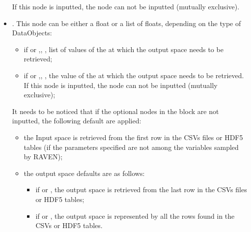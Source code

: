 \begin{itemize}
    If this node is inputted, the node   can not be inputted (mutually exclusive).
  \item {}. This node can be either a float or a list of floats, depending on the type of DataObjects:
   \begin{itemize}
      \item if  or ,, ,  list of values of the
                           at which the output space needs to be retrieved;
      \item if  or ,, ,  the value of the 
         at which the output space needs to be retrieved. If this node is inputted, the node   can not be inputted (mutually exclusive); 
   \end{itemize}
  It needs to be noticed that if the optional nodes in the block  are not inputted, the following default are applied:
    \begin{itemize}
       \item the Input space is retrieved from the first row in the CSVs files or HDF5 tables (if the parameters specified are not among the variables sampled by RAVEN);
       \item  the output space defaults are as follows:
       \begin{itemize}
           \item if  or , the output space is retrieved from the last row in the CSVs files or HDF5 tables;
           \item if  or , the output space is represented by all the rows found in  the CSVs or HDF5 tables.
        \end{itemize}
    \end{itemize}
\end{itemize}


